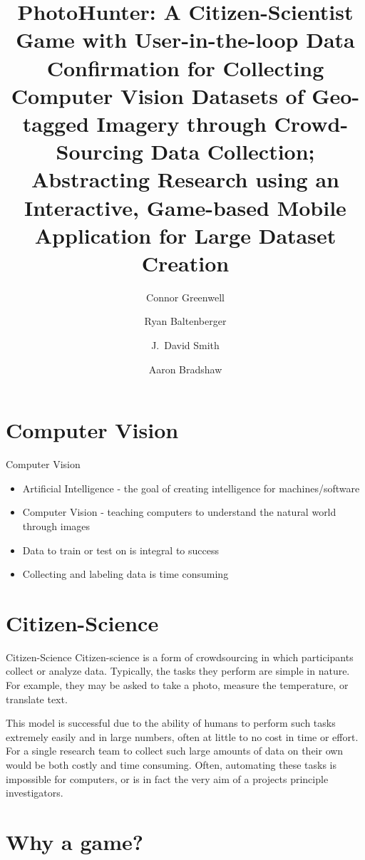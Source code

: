 \documentclass[aspectratio=169]{beamer}
\title[PhotoHunter]{PhotoHunter: A Citizen-Scientist Game with User-in-the-loop 
  Data Confirmation for Collecting Computer Vision Datasets of 
  Geo-tagged Imagery through Crowd-Sourcing Data Collection; 
  Abstracting Research using an Interactive, Game-based Mobile 
  Application for Large Dataset Creation}
\author[]{Connor Greenwell \and Ryan Baltenberger 
  \and J.\ David Smith \and Aaron Bradshaw}
\institute{QuesoTech.com}
\begin{document}
\maketitle

\section{Computer Vision}

\begin{frame}{Computer Vision}
  \begin{itemize}

    \item Artificial Intelligence - the goal of creating intelligence for machines/software

    \item Computer Vision - teaching computers to understand the natural world through images

    \item Data to train or test on is integral to success

    \item Collecting and labeling data is time consuming

  \end{itemize}
\end{frame}

\section{Citizen-Science}

\begin{frame}{Citizen-Science}
  Citizen-science is a form of crowdsourcing in which participants
  collect or analyze data. Typically, the tasks they perform are
  simple
  in nature. For example, they may be asked to take a photo, measure
  the 
  temperature, or translate text.

  This model is successful due to the ability of humans to perform
  such
  tasks extremely easily and in large numbers, often at little to no
  cost in time or effort. For a single research team to collect such
  large amounts of data on their own would be both costly and time
  consuming. Often, automating these tasks is impossible for
  computers,
  or is in fact the very aim of a projects principle investigators.
\end{frame}

\section{Why a game?}
\end{document}
